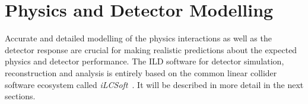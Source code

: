 %
%

\newcommand{\CPP}{C\nolinebreak\hspace{-.05em}\raisebox{.4ex}{\tiny\bf +}\nolinebreak\hspace{-.10em}\raisebox{.4ex}{\tiny\bf +}}


\chapter{ \label{chap:modelling} Physics and Detector Modelling}

Accurate and detailed modelling of the physics interactions as well as the detector
response are crucial for making realistic predictions about the expected physics and detector
performance. The ILD software for detector simulation, reconstruction and analysis is entirely
based on the common linear collider software ecosystem called \emph{iLCSoft}~\cite{bib:ilcsoft}.
It will be described in more detail in the next sections.

